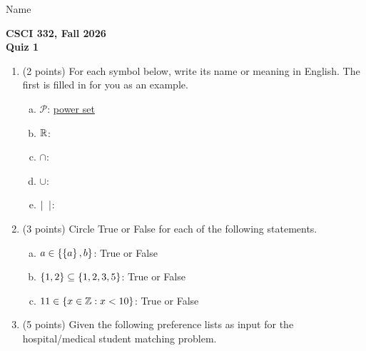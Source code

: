 \documentclass[11pt]{article}
\begin{document}
\noindent Name \underline{\hspace{12cm}}\\


\begin{center}
\Large\textbf{CSCI 332, Fall 2026}%
\\
\LARGE\textbf{Quiz 1}%
\end{center}



\begin{enumerate}


\item (2 points) For each symbol below, write its name or meaning in English. The first is filled in for you as an example.

\begin{enumerate}[(a)]
    \item $\mathcal{P}$: \underline{power set}
    \item $\R$: \underline{\hspace{2in}}
    \item $\cap$: \underline{\hspace{2in}}
    \item $\cup$: \underline{\hspace{2in}}
    \item $|\hspace{2mm} |$: \underline{\hspace{2in}}
\end{enumerate}

\item (3 points) Circle True or False for each of the following statements.

\begin{enumerate}[(a)]
    \item $a \in \left\{ \left\{ a \right\},b \right\}$: True or False
    \item $\left\{ 1,2 \right\} \subseteq \left\{ 1,2,3,5 \right\}$: True or False
    \item $11 \in \Set{x \in \Z: x < 10}$: True or False
\end{enumerate}

\item (5 points) Given the following preference lists as input for the hospital/medical student matching problem.


\end{enumerate}
\end{document}
